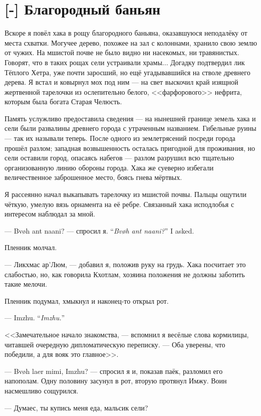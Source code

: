 \section{[-] Благородный баньян}

Вскоре я повёл хака в рощу благородного баньяна, оказавшуюся неподалёку от места схватки.
Могучее дерево, похожее на зал с колоннами, хранило свою землю от чужих.
На мшистой почве не было видно ни насекомых, ни травянистых.
Говорят, что в таких рощах сели устраивали храмы...
Догадку подтвердил лик Тёплого Хетра, уже почти заросший, но ещё угадывавшийся на стволе древнего дерева.
Я встал и ковырнул мох под ним --- на свет выскочил край изящной жертвенной тарелочки из ослепительно белого, <<фарфорового>> нефрита, которым была богата Старая Челюсть.

Память услужливо предоставила сведения --- на нынешней границе земель хака и сели были развалины древнего города с утраченным названием.
Гибельные руины --- так их называли теперь.
После одного из землетрясений посреди города прошёл разлом;
западная возвышенность осталась пригодной для проживания, но сели оставили город, опасаясь набегов --- разлом разрушил всю тщательно организованную линию обороны города.
Хака же суеверно избегали величественное заброшенное место, боясь гнева мёртвых.

Я рассеянно начал выкапывать тарелочку из мшистой почвы.
Пальцы ощутили чёткую, умелую вязь орнамента на её ребре.
Связанный хака исподлобья с интересом наблюдал за мной.

{--- Bv\o h ant naani? --- спросил я.}
{``\textit{Bv\o{}h ant naani?}'' I asked.}

Пленник молчал.

--- Ликхмас ар'Люм, --- добавил я, положив руку на грудь.
Хака посчитает это слабостью, но, как говорила Кхотлам, хозяина положения не должны заботить такие мелочи.

Пленник подумал, хмыкнул и наконец-то открыл рот.

{--- Imzhu.}
{``\textit{Imzhu.}''}

<<Замечательное начало знакомства, --- вспомнил я весёлые слова кормилицы, читавшей очередную дипломатическую переписку.
--- Оба уверены, что победили, а для вояк это главное>>.

--- Bv\o{}h laer mimi, Imzhu? --- спросил я и, показав паёк, разломил его напополам.
Одну половину засунул в рот, вторую протянул Имжу.
Воин насмешливо сощурился.

--- Думаес, ты купись меня еда, мальсик сели?


